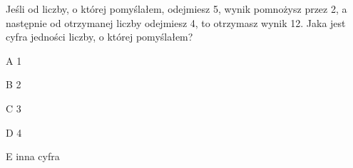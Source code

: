 \begin{tresc}
Jeśli od liczby, o której pomyślałem, odejmiesz 5, wynik pomnożysz przez 2, a następnie od otrzymanej liczby odejmiesz 4, to otrzymasz wynik 12. Jaka jest cyfra jedności liczby, o której pomyślałem?
\end{tresc}
\begin{wariant}{A} 1 \end{wariant}
\begin{wariant}{B} 2 \end{wariant}
\begin{wariant}{C} 3 \end{wariant}
\begin{wariant}{D} 4 \end{wariant}
\begin{wariant}{E} inna cyfra \end{wariant}
